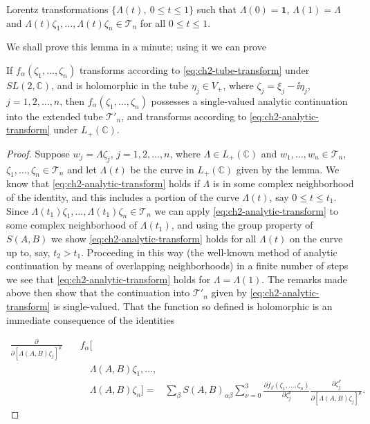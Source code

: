 Lorentz transformations $\{\Lambda(t),\ 0\leq t\leq1\}$ such that
$\Lambda(0)=\mathbf{1}$, $\Lambda(1)=\Lambda$ and
$\Lambda(t)\zeta_1,\ldots,\Lambda(t)\zeta_n\in\mathcal{T}_{n}$ for all
$0\leq t\leq1$.

We shall prove this lemma in a minute; using it we can prove

\begin{theorem}[2-11]\label{thm:ch2-11}
If $f_{\alpha}(\zeta_1,\ldots,\zeta_n)$ transforms according to \eqref{eq:ch2-tube-transform} under
$SL(2,\mathbb C)$, and is holomorphic in the tube $\eta_j\in V_{+}$, where
$\zeta_j=\xi_j-\ii\eta_j$, $j=1,2,\ldots,n$, then $f_{\alpha}(\zeta_1,\ldots,\zeta_n)$
possesses a single-valued analytic continuation into the extended tube
$\mathcal{T}'_{n}$, and transforms according to \eqref{eq:ch2-analytic-transform} under
$L_{+}(\mathbb C)$.
\end{theorem}

\begin{proof}
Suppose $w_j=\Lambda\zeta_j$, $j=1,2,\ldots,n$, where
$\Lambda\in L_{+}(\mathbb C)$ and $w_1,\ldots,w_n\in\mathcal{T}_{n}$,
$\zeta_1,\ldots,\zeta_n\in\mathcal{T}_{n}$ and let $\Lambda(t)$ be the curve
in $L_{+}(\mathbb C)$ given by the lemma.  We know that \eqref{eq:ch2-analytic-transform} holds if
$\Lambda$ is in some complex neighborhood of the identity, and this includes a
portion of the curve $\Lambda(t)$, say $0\leq t\leq t_1$.  Since
$\Lambda(t_1)\zeta_1,\ldots,\Lambda(t_1)\zeta_n\in\mathcal{T}_{n}$ we can
apply \eqref{eq:ch2-analytic-transform} to some complex neighborhood of $\Lambda(t_1)$, and using the
group property of $S(A,B)$ we show \eqref{eq:ch2-analytic-transform} holds for all $\Lambda(t)$ on the
curve up to, say, $t_2>t_1$.  Proceeding in this way (the well-known method of
analytic continuation by means of overlapping neighborhoods) in a finite
number of steps we see that \eqref{eq:ch2-analytic-transform} holds for $\Lambda=\Lambda(1)$.  The
remarks made above then show that the continuation into $\mathcal{T}'_{n}$
given by \eqref{eq:ch2-analytic-transform} is single-valued.  That the function so defined is holomorphic
is an immediate consequence of the identities

{\small
\begin{equation*}
\begin{aligned}
\frac{\partial}{\partial[\Lambda(A,B)\zeta_j]^{\mu}}
&\quad f_{\alpha}\bigl[\\[-2pt]
&\qquad\Lambda(A,B)\zeta_1,\ldots,\\[-2pt]
&\qquad\Lambda(A,B)\zeta_n\bigr]
={}&\sum_{\beta}S(A,B)_{\alpha\beta}
 \sum_{\nu=0}^{3}
 \frac{\partial f_{\beta}(\zeta_1,\ldots,\zeta_n)}{\partial\zeta_j^{\nu}}
 \frac{\partial\zeta_j^{\nu}}
      {\partial[\Lambda(A,B)\zeta_j]^{\mu}} .
\end{aligned}
\end{equation*}
}
\end{proof}

